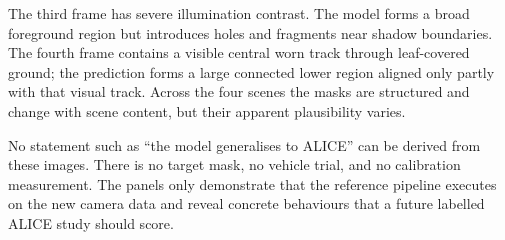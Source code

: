 The third frame has severe illumination contrast. The model forms a broad
foreground region but introduces holes and fragments near shadow boundaries.
The fourth frame contains a visible central worn track through leaf-covered
ground; the prediction forms a large connected lower region aligned only
partly with that visual track. Across the four scenes the masks are structured
and change with scene content, but their apparent plausibility varies.

No statement such as ``the model generalises to ALICE'' can be derived from
these images. There is no target mask, no vehicle trial, and no calibration
measurement. The panels only demonstrate that the reference pipeline executes on
the new camera data and reveal concrete behaviours that a future labelled
ALICE study should score.
